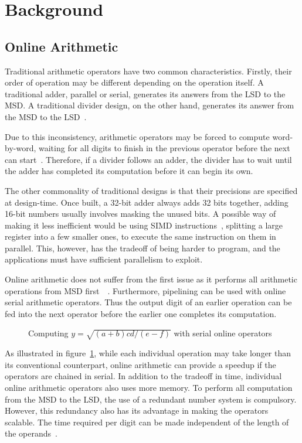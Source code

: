 \section{Background}

\subsection{Online Arithmetic}
Traditional arithmetic operators have two common characteristics.
Firstly, their order of operation may be different depending on the operation itself.
A traditional adder, parallel or serial, generates its answers from the LSD to the MSD.
A traditional divider design, on the other hand, generates its answer from the MSD to the LSD~\cite{Brent1}\cite{Srinivas1}.

Due to this inconsistency, arithmetic operators may be forced to compute word-by-word, waiting for all digits to finish in the previous operator before the next can start~\cite{Zhao1}.
Therefore, if a divider follows an adder, the divider has to wait until the adder has completed its computation before it can begin its own.

The other commonality of traditional designs is that their precisions are specified at design-time.
Once built, a 32-bit adder always adds 32 bits together, adding 16-bit numbers usually involves masking the unused bits.
A possible way of making it less inefficient would be using SIMD instructions~\cite{Duncan1}, splitting a large register into a few smaller ones, to execute the same instruction on them in parallel.
This, however, has the tradeoff of being harder to program, and the applications must have sufficient parallelism to exploit.

Online arithmetic does not suffer from the first issue as it performs all arithmetic operations from MSD first~\cite{Ercegovac1}~\cite{Ercegovac2}.
Furthermore, pipelining can be used with online serial arithmetic operators.
Thus the output digit of an earlier operation can be fed into the next operator before the earlier one completes its computation.

\begin{figure}[H]
  \centering
  
  \caption{Computing $y=\sqrt{(a+b)cd/(e-f)}$ with serial online            operators~\cite{Ercegovac1}}
  \label{Online}
\end{figure}

As illustrated in figure~\ref{Online}, while each individual operation may take longer than its conventional counterpart, online arithmetic can provide a speedup if the operators are chained in serial.
In addition to the tradeoff in time, individual online arithmetic operators also uses more memory.
To perform all computation from the MSD to the LSD, the use of a redundant number system is compulsory.
However, this redundancy also has its advantage in making the operators scalable.
The time required per digit can be made independent of the length of the operands~\cite{Trivedi1}.

